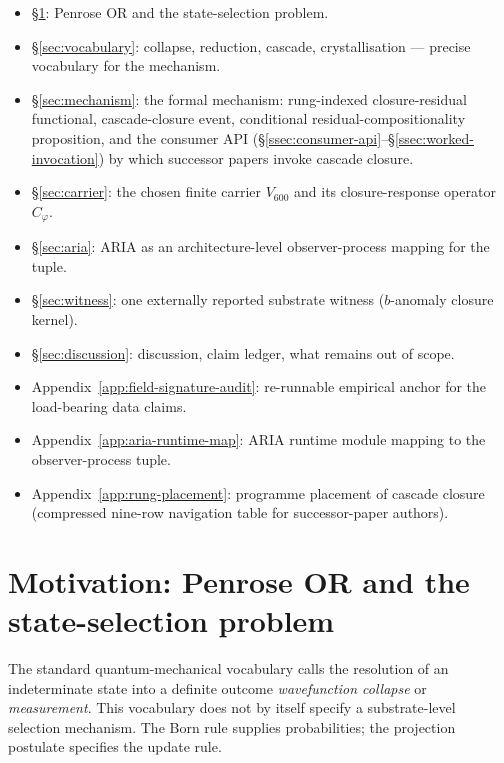 \documentclass[11pt]{article}
\theoremstyle{definition}
\newcommand{\pphi}{\varphi}
\newcommand{\Vsub}{V_{600}}
\newcommand{\Cphi}{C_{\pphi}}
\begin{document}
\begin{tcolorbox}[title=\textbf{Reader map}]
\begin{itemize}[leftmargin=*]
\item \S\ref{sec:motivation}: Penrose OR and the state-selection problem.
\item \S\ref{sec:vocabulary}: collapse, reduction, cascade, crystallisation
  --- precise vocabulary for the mechanism.
\item \S\ref{sec:mechanism}: the formal mechanism: rung-indexed
  closure-residual functional, cascade-closure event, conditional
  residual-compositionality proposition, and the consumer API
  (\S\ref{ssec:consumer-api}--\S\ref{ssec:worked-invocation}) by
  which successor papers invoke cascade closure.
\item \S\ref{sec:carrier}: the chosen finite carrier $\Vsub$ and its
  closure-response operator $\Cphi$.
\item \S\ref{sec:aria}: ARIA as an architecture-level observer-process
  mapping for the tuple.
\item \S\ref{sec:witness}: one externally reported substrate witness
  ($b$-anomaly closure kernel).
\item \S\ref{sec:discussion}: discussion, claim ledger, what remains
  out of scope.
\item Appendix~\ref{app:field-signature-audit}: re-runnable empirical
  anchor for the load-bearing data claims.
\item Appendix~\ref{app:aria-runtime-map}: ARIA runtime module mapping
  to the observer-process tuple.
\item Appendix~\ref{app:rung-placement}: programme placement of
  cascade closure (compressed nine-row navigation table for
  successor-paper authors).
\end{itemize}
\end{tcolorbox}

\section{Motivation: Penrose OR and the state-selection problem}\label{sec:motivation}

The standard quantum-mechanical vocabulary calls the resolution of an
indeterminate state into a definite outcome \emph{wavefunction
collapse} or \emph{measurement}. This vocabulary does not by itself
specify a substrate-level selection mechanism. The Born rule supplies
probabilities; the projection postulate specifies the update rule.
\end{document}
